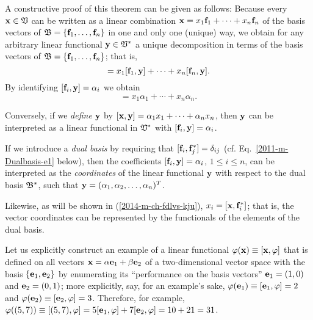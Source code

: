 {\color{OliveGreen}
\bproof
A constructive proof  of this theorem can be given as follows:
Because every ${\bf x}\in {\frak V}$
can be written as a linear combination $ {\bf x} = x_1 {\bf f}_1 +\cdots + x_n {\bf f}_n$
of the basis vectors of ${\frak B} = \{{\bf f}_1,\ldots , {\bf f}_n\}$
in one and only one (unique) way, we obtain for any arbitrary linear functional ${\bf y} \in {\frak V}^\ast $  a unique decomposition
in terms of the basis vectors of  ${\frak B} = \{{\bf f}_1,\ldots , {\bf f}_n\}$; that is,
\begin{equation}
[{\bf x},{\bf y}]
=
x_1 [{\bf f}_1 ,{\bf y}] +\cdots + x_n [{\bf f}_n ,{\bf y}] .
\end{equation}
By identifying  $[{\bf f}_i ,{\bf y}]=\alpha_i$ we obtain
\begin{equation}
[{\bf x},{\bf y}]
=
x_1 \alpha_1 +\cdots + x_n \alpha_n .
\end{equation}
\eproof
}

Conversely, if we {\em define} ${\bf y}$ by $[{\bf x},{\bf y}] =\alpha_1  x_1+ \cdots +\alpha_n x_n$, then ${\bf y}$
can be interpreted as a linear functional in ${\frak V}^\ast$ with $[{\bf f}_i,{\bf y}] = \alpha_i$.

If we introduce a {\em dual basis}
by requiring that $[{\bf f}_i,  {\bf f}_j^\ast ]=\delta_{ij}$ (cf. Eq.~\ref{2011-m-Dualbasis-e1} below),
then the coefficients $[{\bf f}_i ,{\bf y}] = \alpha_i$,
$1\le i \le n$, can be interpreted
as the {\em coordinates} of the linear functional ${\bf y}$ with respect to the dual
basis ${\frak B}^\ast$, such that ${\bf y}=(\alpha_1,\alpha_2,\ldots , \alpha_n)^T$.

Likewise, as will be shown in (\ref{2014-m-ch-fdlvs-kju}),
$
x_i =
 [{\bf x},{\bf f}_i^\ast ]
$; that is, the vector coordinates can be represented by the functionals of the elements of the dual basis.


{\color{blue}
\bexample
Let us explicitly construct an example of a linear functional $\varphi ({\bf x})\equiv [{\bf x},\varphi]$ that is defined
on all vectors ${\bf x}=
\alpha {\bf e}_1
+
\beta {\bf e}_2
$
of a two-dimensional vector space with the basis $\{{\bf e}_1, {\bf e}_2 \}$
by enumerating its ``performance on the basis vectors''  ${\bf e}_1=(1,0)$ and ${\bf e}_2=(0,1)$;
more explicitly,  say, for an example's sake,
$\varphi ({\bf e}_1 ) \equiv [ {\bf e}_1,\varphi ] = 2$ and
$\varphi ({\bf e}_2 ) \equiv [ {\bf e}_2,\varphi ] = 3$.
Therefore, for example,
$\varphi ((5,7) ) \equiv [(5,7), \varphi ] = 5 [{\bf e}_1, \varphi ] + 7 [ {\bf e}_2,\varphi ]
=10+21=31$.
\eexample
}

